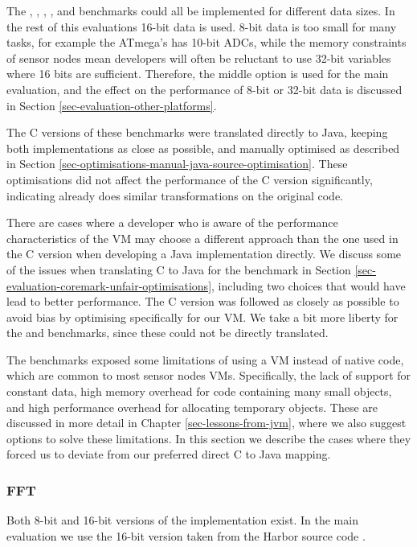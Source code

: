 The , , , , and  benchmarks could all be implemented for different data sizes. In the rest of this evaluations 16-bit data is used. 8-bit data is too small for many tasks, for example the ATmega's has 10-bit ADCs, while the memory constraints of sensor nodes mean developers will often be reluctant to use 32-bit variables where 16 bits are sufficient. Therefore, the middle option is used for the main evaluation, and the effect on the performance of 8-bit or 32-bit data is discussed in Section \ref{sec-evaluation-other-platforms}.

The C versions of these benchmarks were translated directly to Java, keeping both implementations as close as possible, and manually optimised as described in Section \ref{sec-optimisations-manual-java-source-optimisation}. These optimisations did not affect the performance of the C version significantly, indicating  already does similar transformations on the original code.

There are cases where a developer who is aware of the performance characteristics of the VM may choose a different approach than the one used in the C version when developing a Java implementation directly. We discuss some of the issues when translating C to Java for the  benchmark in Section \ref{sec-evaluation-coremark-unfair-optimisations}, including two choices that would have lead to better performance. The C version was followed as closely as possible to avoid bias by optimising specifically for our VM. We take a bit more liberty for the  and  benchmarks, since these could not be directly translated.

The benchmarks exposed some limitations of using a VM instead of native code, which are common to most sensor nodes VMs. Specifically, the lack of support for constant data, high memory overhead for code containing many small objects, and high performance overhead for allocating temporary objects. These are discussed in more detail in Chapter \ref{sec-lessons-from-jvm}, where we also suggest options to solve these limitations. In this section we describe the cases where they forced us to deviate from our preferred direct C to Java mapping.

\subsubsection{FFT}
Both 8-bit and 16-bit versions of the  implementation exist. In the main evaluation we use the 16-bit version taken from the Harbor source code \cite{sos-operating-system}.

